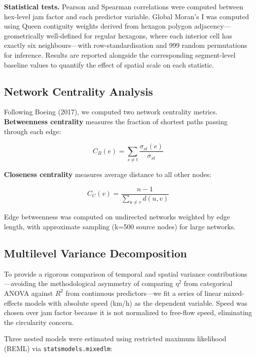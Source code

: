 \documentclass[12pt,a4paper]{article}
\begin{document}
\textbf{Statistical tests.} Pearson and Spearman correlations were computed between hex-level jam factor and each predictor variable. Global Moran's I was computed using Queen contiguity weights derived from hexagon polygon adjacency---geometrically well-defined for regular hexagons, where each interior cell has exactly six neighbours---with row-standardisation and 999 random permutations for inference. Results are reported alongside the corresponding segment-level baseline values to quantify the effect of spatial scale on each statistic.

\subsection{Network Centrality Analysis}

Following Boeing (2017), we computed two network centrality metrics. \textbf{Betweenness centrality} measures the fraction of shortest paths passing through each edge:

\[C_B(e) = \sum_{s \neq t} \frac{\sigma_{st}(e)}{\sigma_{st}}\]

\textbf{Closeness centrality} measures average distance to all other nodes:

\[C_C(v) = \frac{n-1}{\sum_{u \neq v} d(u,v)}\]

Edge betweenness was computed on undirected networks weighted by edge length, with approximate sampling (k=500 source nodes) for large networks.

\subsection{Multilevel Variance Decomposition}

To provide a rigorous comparison of temporal and spatial variance contributions---avoiding the methodological asymmetry of comparing $\eta^2$ from categorical ANOVA against $R^2$ from continuous predictors---we fit a series of linear mixed-effects models with absolute speed (km/h) as the dependent variable. Speed was chosen over jam factor because it is not normalized to free-flow speed, eliminating the circularity concern.

Three nested models were estimated using restricted maximum likelihood (REML) via \texttt{statsmodels.mixedlm}:
\end{document}
